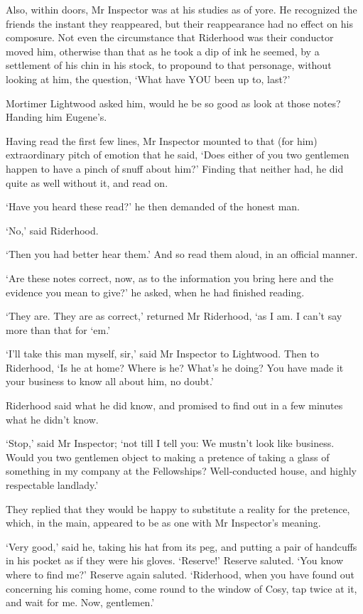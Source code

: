 Also, within doors, Mr Inspector was at his studies as of yore.
He recognized the friends the instant they reappeared, but their
reappearance had no effect on his composure. Not even the circumstance
that Riderhood was their conductor moved him, otherwise than that as he
took a dip of ink he seemed, by a settlement of his chin in his stock,
to propound to that personage, without looking at him, the question,
‘What have YOU been up to, last?’

Mortimer Lightwood asked him, would he be so good as look at those
notes? Handing him Eugene’s.

Having read the first few lines, Mr Inspector mounted to that (for him)
extraordinary pitch of emotion that he said, ‘Does either of you two
gentlemen happen to have a pinch of snuff about him?’ Finding that
neither had, he did quite as well without it, and read on.

‘Have you heard these read?’ he then demanded of the honest man.

‘No,’ said Riderhood.

‘Then you had better hear them.’ And so read them aloud, in an official
manner.

‘Are these notes correct, now, as to the information you bring here and
the evidence you mean to give?’ he asked, when he had finished reading.

‘They are. They are as correct,’ returned Mr Riderhood, ‘as I am. I
can’t say more than that for ‘em.’

‘I’ll take this man myself, sir,’ said Mr Inspector to Lightwood. Then
to Riderhood, ‘Is he at home? Where is he? What’s he doing? You have
made it your business to know all about him, no doubt.’

Riderhood said what he did know, and promised to find out in a few
minutes what he didn’t know.

‘Stop,’ said Mr Inspector; ‘not till I tell you: We mustn’t look like
business. Would you two gentlemen object to making a pretence of taking
a glass of something in my company at the Fellowships? Well-conducted
house, and highly respectable landlady.’

They replied that they would be happy to substitute a reality for the
pretence, which, in the main, appeared to be as one with Mr Inspector’s
meaning.

‘Very good,’ said he, taking his hat from its peg, and putting a pair of
handcuffs in his pocket as if they were his gloves. ‘Reserve!’ Reserve
saluted. ‘You know where to find me?’ Reserve again saluted. ‘Riderhood,
when you have found out concerning his coming home, come round to the
window of Cosy, tap twice at it, and wait for me. Now, gentlemen.’

